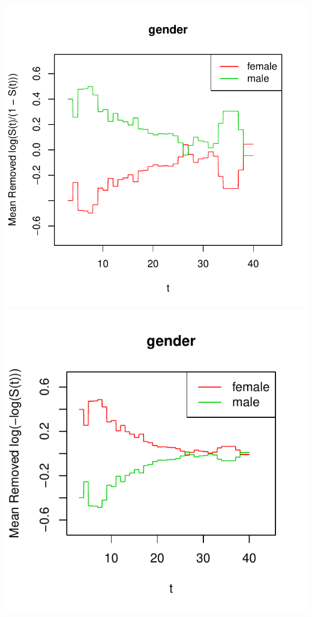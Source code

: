 \documentclass[a4paper]{article}
\begin{document}
\begin{minipage}[t]{.85\linewidth}%
\includegraphics{icenReg-024}
\includegraphics{icenReg-025}
\end{minipage}
\end{document}
